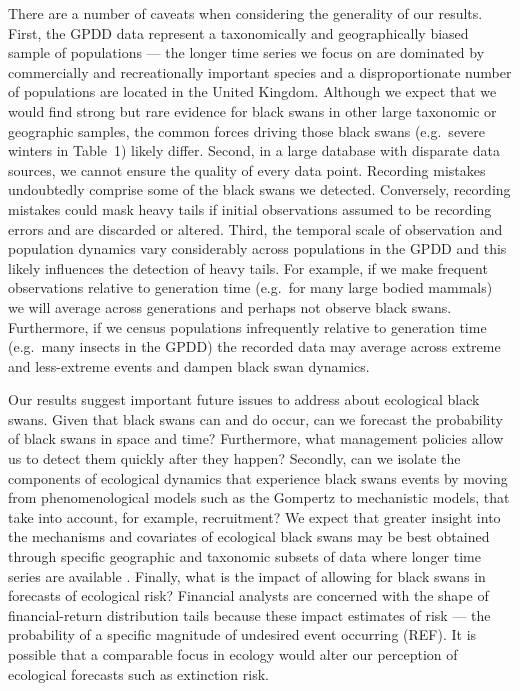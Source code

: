 There are a number of caveats when considering the generality of our results.
First, the GPDD data represent a taxonomically and geographically biased sample
of populations --- the longer time series we focus on are dominated by
commercially and recreationally important species and a disproportionate number
of populations are located in the United Kingdom. Although we expect that we
would find strong but rare evidence for black swans in other large taxonomic or
geographic samples, the common forces driving those black swans (e.g.~severe
winters in Table~1) likely differ. Second, in a large database with disparate
data sources, we cannot ensure the quality of every data point. Recording
mistakes undoubtedly comprise some of the black swans we detected. Conversely,
recording mistakes could mask heavy tails if initial observations assumed to be
recording errors and are discarded or altered. Third, the temporal scale of
observation and population dynamics vary considerably across populations in the
GPDD and this likely influences the detection of heavy tails. For example, if
we make frequent observations relative to generation time (e.g.~for many large
bodied mammals) we will average across generations and perhaps not observe
black swans. Furthermore, if we census populations infrequently relative to
generation time (e.g.~many insects in the GPDD) the recorded data may average
across extreme and less-extreme events and dampen black swan dynamics.

Our results suggest important future issues to address about ecological black
swans. Given that black swans can and do occur, can we forecast the probability
of black swans in space and time? Furthermore, what management policies allow
us to detect them quickly after they happen? Secondly, can we isolate the
components of ecological dynamics that experience black swans events by moving
from phenomenological models such as the Gompertz to mechanistic models, that
take into account, for example, recruitment? We expect that greater insight
into the mechanisms and covariates of ecological black swans may be best
obtained through specific geographic and taxonomic subsets of data where longer
time series are available \citep[e.g.][]{segura2013}. Finally, what is the
impact of allowing for black swans in forecasts of ecological risk? Financial
analysts are concerned with the shape of financial-return distribution tails
because these impact estimates of risk --- the probability of a specific
magnitude of undesired event occurring (REF). It is possible that a comparable
focus in ecology would alter our perception of ecological forecasts such as
extinction risk.

